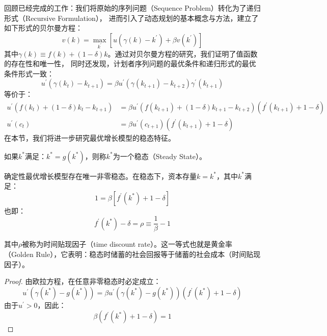 回顾已经完成的工作：我们将原始的序列问题（Sequence Problem）转化为了递归形式（Recursive Formulation），
进而引入了动态规划的基本概念与方法，建立了如下形式的贝尔曼方程：
$$
v\left(k\right)=\max _{k^{\prime}}\left[u\left(\gamma\left(k\right)-k^{\prime}\right)+\beta v\left(k^{\prime}\right)\right]
$$
其中$\gamma\left(k\right)\equiv f\left(k\right)+\left(1-\delta\right)k$。通过对贝尔曼方程的研究，我们证明了值函数的存在性和唯一性，
同时还发现，计划者序列问题的最优条件和递归形式的最优条件形式一致：
\begin{equation*}    
    u^{\prime}\left(\gamma\left(k_t\right)-k_{t+1}\right) = 
        \beta u^{\prime}\left(\gamma\left(k_{t+1}\right)-k_{t+2}\right)\gamma^{\prime}\left(k_{t+1}\right)
\end{equation*}
等价于：
\begin{equation*}
    \begin{aligned}
        u^{\prime}\left(f\left(k_t\right)+\left(1-\delta\right)k_t-k_{t+1}\right) &= 
        \beta u^{\prime}\left(f\left(k_{t+1}\right)+\left(1-\delta\right)k_{t+1}-k_{t+2}\right)\left(f^{\prime}\left(k_{t+1}\right)+1-\delta\right) \\
        u^{\prime}\left(c_t\right)&=\beta u^{\prime}\left(c_{t+1}\right)\left(f^{\prime}\left(k_{t+1}\right)+1-\delta\right)
    \end{aligned}
\end{equation*}
在本节，我们将进一步研究最优增长模型的稳态特征。

\begin{definition}[\textbf{稳态}]
    如果$k^*$满足：$k^*=g(k^*)$，则称$k^*$为一个稳态（Steady State）。
\end{definition}

\begin{theorem}    \label{th-ss-exist}
    确定性最优增长模型存在唯一非零稳态。在稳态下，资本存量$k=k^*$，其中$k^*$满足：
    $$1=\beta\left[f^{\prime}\left(k^*\right)+1-\delta\right]$$
    也即：
    \begin{equation} \label{eq-ss-rho}
        f^{\prime}\left(k^*\right)-\delta = \rho \equiv \frac{1}{\beta}-1
    \end{equation}
\end{theorem}
其中$\rho$被称为时间贴现因子（time discount rate）。这一等式也就是黄金率（Golden Rule），它表明：稳态时储蓄的社会回报等于储蓄的社会成本（时间贴现因子）。
\begin{proof}
    由欧拉方程，在任意非零稳态时必定成立：
    \begin{equation*}
        u^{\prime}\left(\gamma\left(k^*\right)-g\left(k^*\right)\right)
            = \beta u^{\prime}\left(\gamma\left(k^*\right)-g\left(k^*\right)\right)\left(f^{\prime}\left(k^*\right)+1-\delta\right)
    \end{equation*}
    由于$u^{\prime}>0$，因此：
    \begin{equation*}
        \beta\left(f^{\prime}\left(k^*\right)+1-\delta\right) = 1
    \end{equation*}
\end{proof}

